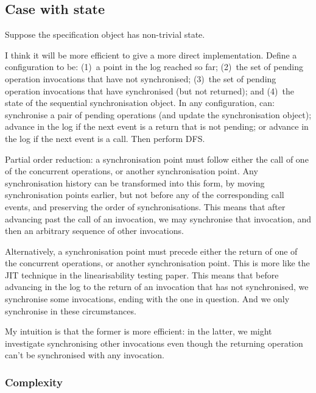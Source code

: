 
\subsection{Case with state}

Suppose the specification object has non-trivial state. 

I think it will be more efficient to give a more direct implementation.
Define a configuration to be: (1)~a point in the log reached so far; (2)~the
set of pending operation invocations that have not synchronised; (3)~the set
of pending operation invocations that have synchronised (but not returned);
and (4)~the state of the sequential synchronisation object.  In any
configuration, can: synchronise a pair of pending operations (and update the
synchronisation object); advance in the log if the next event is a return that
is not pending; or advance in the log if the next event is a call.  Then
perform DFS.

Partial order reduction: a synchronisation point must follow either the
call of one of the concurrent operations, or another synchronisation
point.  Any synchronisation history can be transformed into this form, by
moving synchronisation points earlier, but not before any of the corresponding
call events, and preserving the order of synchronisations.  This means that
after advancing past the call of an invocation, we may synchronise that
invocation, and then an arbitrary sequence of other invocations. 

Alternatively, a synchronisation point must precede either the return of one
of the concurrent operations, or another synchronisation point.  This is more
like the JIT technique in the linearisability testing paper.  This means that
before advancing in the log to the return of an invocation that has not
synchronised, we synchronise some invocations, ending with the one in
question.  And we only synchronise in these circumstances. 

My intuition is that the former is more efficient: in the latter, we might
investigate synchronising other invocations even though the returning
operation can't be synchronised with any invocation.  


\subsubsection*{Complexity}

